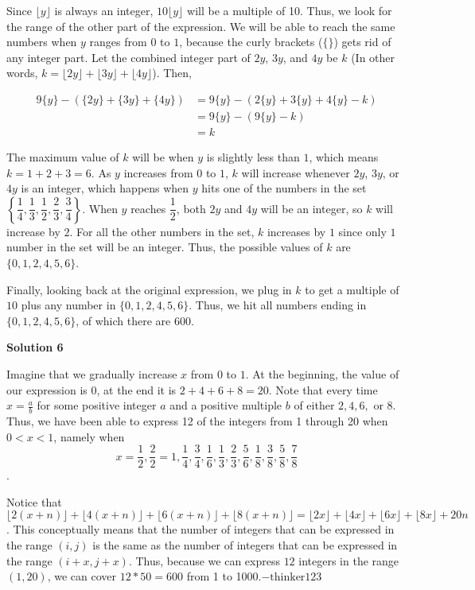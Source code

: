 \begin{enumerate}
 Since $\lfloor y \rfloor$ is always an integer, $10\lfloor y \rfloor$ will be a multiple of 10. Thus, we look for the range of the other part of the expression. We will be able to reach the same numbers when $y$ ranges from $0$ to $1$, because the curly brackets ($\{\}$) gets rid of any integer part. Let the combined integer part of $2y$, $3y$, and $4y$ be $k$ (In other words, $k = \lfloor 2y \rfloor + \lfloor 3y \rfloor + \lfloor 4y \rfloor$). Then, 

 
 \begin{align*} 9\{y\} - (\{2y\} + \{3y\} + \{4y\}) &= 9\{y\} - (2\{y\} + 3\{y\} + 4\{y\} - k) \\ &= 9\{y\} - (9\{y\} - k) \\ &= k \end{align*}


 The maximum value of $k$ will be when $y$ is slightly less than $1$, which means $k = 1 + 2 + 3 = 6$. As $y$ increases from $0$ to $1$, $k$ will increase whenever $2y$, $3y$, or $4y$ is an integer, which happens when $y$ hits one of the numbers in the set $\left\{\dfrac14, \dfrac13, \dfrac12, \dfrac23, \dfrac34 \right\}$. When $y$ reaches $\dfrac12$, both $2y$ and $4y$ will be an integer, so $k$ will increase by $2$. For all the other numbers in the set, $k$ increases by $1$ since only $1$ number in the set will be an integer. Thus, the possible values of $k$ are $\{0, 1, 2, 4, 5, 6\}$. 

 Finally, looking back at the original expression, we plug in $k$ to get a multiple of $10$ plus any number in $\{0, 1, 2, 4, 5, 6\}$. Thus, we hit all numbers ending in $\{0, 1, 2, 4, 5, 6\}$, of which there are $\boxed{600}$. 

 



\textbf{Solution 6}

Imagine that we gradually increase $x$ from $0$ to $1$. At the beginning, the value of our expression is $0$, at the end it is $2+4+6+8=20$. Note that every time $x=\frac{a}{b}$ for some positive integer $a$ and a positive multiple $b$ of either $2, 4, 6,$ or $8$. Thus, we have been able to express 12 of the integers from 1 through 20 when $0<x<1$, namely when 
 \[x = \frac{1}{2}, \frac{2}{2}=1, \frac{1}{4}, \frac{3}{4}, \frac{1}{6}, \frac{1}{3}, \frac{2}{3}, \frac{5}{6}, \frac{1}{8}, \frac{3}{8}, \frac{5}{8}, \frac{7}{8}\].

 
Notice that 
 \[\lfloor 2(x+n) \rfloor + \lfloor 4(x+n)\rfloor + \lfloor 6(x+n) \rfloor+ \lfloor8(x+n) \rfloor= \lfloor 2x \rfloor+ \lfloor 4x \rfloor+ \lfloor 6x \rfloor+ \lfloor 8x \rfloor+ 20n\]. This conceptually means that the number of integers that can be expressed in the range $(i, j)$ is the same as the number of integers that can be expressed in the range $(i+x, j+x)$. Thus, because we can express $12$ integers in the range $(1, 20)$, we can cover $12*50 = \boxed{600}$ from 1 to 1000.$-\text{thinker123}$





\end{enumerate}

